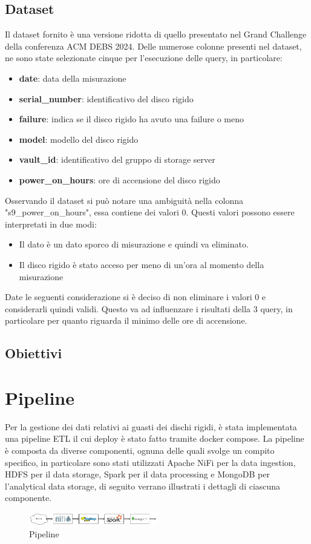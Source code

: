 \documentclass[conference]{IEEEtran}
\begin{document}
\subsection*{Dataset}
Il dataset fornito è una versione ridotta di quello presentato nel Grand Challenge della conferenza ACM DEBS 2024. Delle numerose colonne presenti nel dataset, ne sono state selezionate cinque per l'esecuzione delle query, in particolare:
\begin{itemize}
    \item \textbf{date}: data della misurazione
    \item \textbf{serial\_number}: identificativo del disco rigido
    \item \textbf{failure}: indica se il disco rigido ha avuto una failure o meno
    \item \textbf{model}: modello del disco rigido
    \item \textbf{vault\_id}: identificativo del gruppo di storage server
    \item \textbf{power\_on\_hours}: ore di accensione del disco rigido
\end{itemize}
Osservando il dataset si può notare una ambiguità nella colonna "s9\_power\_on\_hours", essa contiene dei valori 0. Questi valori possono essere interpretati in due modi:
\begin{itemize}
    \item Il dato è un dato sporco di misurazione e quindi va eliminato.
    \item Il disco rigido è stato acceso per meno di un'ora al momento della misurazione
\end{itemize}
Date le seguenti considerazione si è deciso di non eliminare i valori 0 e considerarli quindi validi. Questo va ad influenzare i risultati della 3 query, in particolare per quanto riguarda il minimo delle ore di accensione.
\subsection{Obiettivi}
\section{Pipeline}
Per la gestione dei dati relativi ai guasti dei dischi rigidi, è stata implementata una pipeline ETL il cui deploy è stato fatto tramite docker compose. La pipeline è composta da diverse componenti, ognuna delle quali svolge un compito specifico, in particolare sono stati utilizzati Apache NiFi per la data ingestion, HDFS per il data storage, Spark per il data processing e MongoDB per l'analytical data storage, di seguito verrano illustrati i dettagli di ciascuna componente.
\begin{figure}[H]
    \centering
    \includegraphics[width=0.5\textwidth]{./res/pipeline_2.png}
    \caption{Pipeline}
    \label{fig:pipeline}
\end{figure} 
\end{document}
